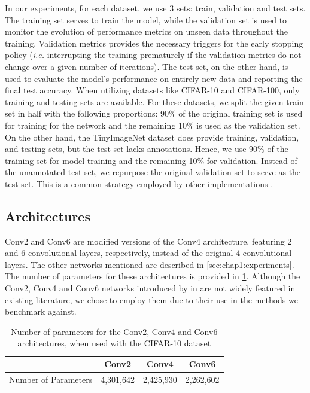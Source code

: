 In our experiments, for each dataset, we use 3 sets: train, validation and test
sets. The training set serves to train the model, while the validation set is
used to monitor the evolution of performance metrics on unseen data throughout
the training. Validation metrics provides the necessary triggers for the early
stopping policy (\emph{i.e.} interrupting the training prematurely if the
validation metrics do not change over a given number of iterations). The test
set, on the other hand, is used to evaluate the model's performance on entirely
new data and reporting the final test accuracy. When utilizing datasets like
CIFAR-10 and CIFAR-100, only training and testing sets are available. For these
datasets, we split the given train set in half with the following proportions:
90\% of the original training set is used for training for the network and the
remaining 10\% is used as the validation set. On the other hand, the
TinyImageNet dataset does provide training, validation, and testing sets, but
the test set lacks annotations. Hence, we use 90\% of the training set for model
training and the remaining 10\% for validation. Instead of the unannotated test
set, we repurpose the original validation set to serve as the test set. This is
a common strategy employed by other implementations
\cite{hanyuanxu2018tinyimagenet,nbdt,alvinwan2020nbdt}.\\

\subsection{Architectures}\label{sec:intro:architectures}

Conv2 and Conv6 are modified versions of the Conv4 architecture, featuring 2 and
6 convolutional layers, respectively, instead of the original 4 convolutional
layers. The other networks mentioned are described in
\cref{sec:chap1:experiments}. The number of parameters for these architectures
is provided in \cref{tab:chap2:conv_num_params}. Although the Conv2, Conv4 and
Conv6 networks introduced by \citeauthor{DBLP:conf/iclr/FrankleC19} in
\cite{DBLP:conf/iclr/FrankleC19} are not widely featured in existing literature,
we chose to employ them due to their use in the methods we benchmark against.

\begin{table}[ht!]
  \centering\begin{tabular}{lccc}
    \cmidrule[\heavyrulewidth]{2-4}
                         & \textbf{Conv2} & \textbf{Conv4} & \textbf{Conv6} \\ \toprule
    Number of Parameters & 4,301,642      & 2,425,930      & 2,262,602      \\ \bottomrule
  \end{tabular}
  \caption{Number of parameters for the Conv2, Conv4 and Conv6 architectures, when used with the CIFAR-10 dataset}
  \label{tab:chap2:conv_num_params}
\end{table}

